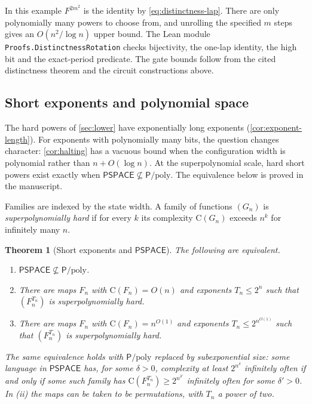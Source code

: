 \documentclass[11pt]{article}
\newtheorem{theorem}{Theorem}[section]
\theoremstyle{definition}
\theoremstyle{remark}
\newcommand{\CC}{\mathrm{C}}
\numberwithin{equation}{section}
\begin{document}
In this example $F^{2m^2}$ is the identity by \cref{eq:distinctness-lap}.
There are only polynomially many powers to choose from, and unrolling
the specified $m$ steps gives an $O(n^2/\log n)$ upper bound.
The Lean module \texttt{Proofs.DistinctnessRotation} checks bijectivity,
the one-lap identity, the high bit and the exact-period predicate.
The gate bounds follow from the cited distinctness theorem and the
circuit constructions above.

\subsection{Short exponents and polynomial space}\label{sec:short-exponents}

The hard powers of \cref{sec:lower} have exponentially long exponents
(\cref{cor:exponent-length}).  For exponents with polynomially many bits,
the question changes character: \cref{cor:halting} has a vacuous bound
when the configuration width is polynomial rather than $n+O(\log n)$.
At the superpolynomial scale, hard short powers exist exactly when
$\mathsf{PSPACE}\not\subseteq\mathsf{P}/\mathrm{poly}$. The equivalence
below is proved in the manuscript.

Families are indexed by the state width.  A family of functions $(G_n)$
is \emph{superpolynomially hard} if for every $k$ its complexity
$\CC(G_n)$ exceeds $n^k$ for infinitely many $n$.

\begin{theorem}[Short exponents and $\mathsf{PSPACE}$]\label{thm:pspace-short}
The following are equivalent.
\begin{enumerate}[label=(\roman*)]
\item $\mathsf{PSPACE}\not\subseteq\mathsf{P}/\mathrm{poly}$.
\item There are maps $F_n$ with $\CC(F_n)=O(n)$ and exponents
  $T_n\leq 2^n$ such that $(F_n^{T_n})$ is superpolynomially hard.
\item There are maps $F_n$ with $\CC(F_n)=n^{O(1)}$ and exponents
  $T_n\leq 2^{n^{O(1)}}$ such that $(F_n^{T_n})$ is superpolynomially hard.
\end{enumerate}
The same equivalence holds with $\mathsf{P}/\mathrm{poly}$ replaced by
subexponential size: some language in $\mathsf{PSPACE}$ has, for some
$\delta>0$, complexity at least $2^{n^\delta}$ infinitely often if and
only if some such family has $\CC(F_n^{T_n})\geq 2^{n^{\delta'}}$
infinitely often for some $\delta'>0$.  In (ii) the maps can be taken
to be permutations, with $T_n$ a power of two.
\end{theorem}
\end{document}
